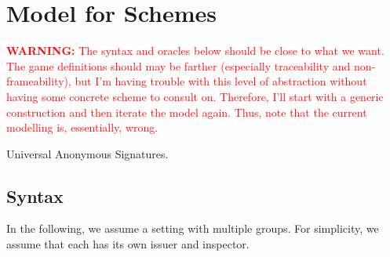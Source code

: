 \section{Model for \UAS Schemes}
\label{sec:model-uas}

\textcolor{red}{\textbf{WARNING:} The syntax and oracles below should be close
  to what we want. The game definitions should may be farther (especially
  traceability and non-frameability), but I'm having trouble with this level
  of abstraction without having some concrete scheme to consult on. Therefore,
  I'll start with a generic construction and then iterate the model again.
  Thus, note that the current modelling is, essentially, wrong.}

Universal Anonymous Signatures.

\subsection{Syntax}
\label{ssec:syntax}

In the following, we assume a setting with multiple groups. For simplicity,
we assume that each has its own issuer and inspector.




